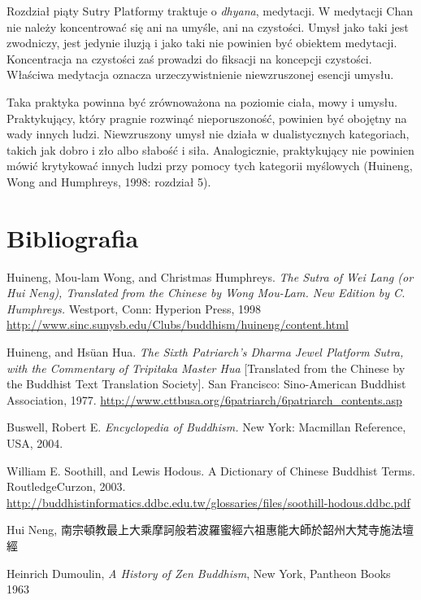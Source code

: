 Rozdział piąty Sutry Platformy traktuje o \emph{dhyana}, medytacji. W medytacji Chan nie należy koncentrować się ani na umyśle, ani na czystości. Umysł jako taki jest zwodniczy, jest jedynie iluzją i jako taki nie powinien być obiektem medytacji. Koncentracja na czystości zaś prowadzi do fiksacji na koncepcji czystości. Właściwa medytacja oznacza urzeczywistnienie niewzruszonej esencji umysłu.

Taka praktyka powinna być zrównoważona na poziomie ciała, mowy i umysłu. Praktykujący, który pragnie rozwinąć nieporuszoność, powinien być obojętny na wady innych ludzi. Niewzruszony umysł nie działa w dualistycznych kategoriach, takich jak dobro i zło albo słabość i siła. Analogicznie, praktykujący nie powinien mówić krytykować innych ludzi przy pomocy tych kategorii myślowych (Huineng, Wong and Humphreys, 1998: rozdział 5).

\section*{Bibliografia}

Huineng, Mou-lam Wong, and Christmas Humphreys. \emph{The Sutra of Wei Lang (or Hui Neng), Translated from the Chinese by Wong Mou-Lam. New Edition by C. Humphreys.} Westport, Conn: Hyperion Press, 1998 
\url{http://www.sinc.sunysb.edu/Clubs/buddhism/huineng/content.html}

Huineng, and Hsüan Hua. \emph{The Sixth Patriarch's Dharma Jewel Platform Sutra, with the Commentary of Tripitaka Master Hua} [Translated from the Chinese by the Buddhist Text Translation Society]. San Francisco: Sino-American Buddhist Association, 1977.
\url{http://www.cttbusa.org/6patriarch/6patriarch_contents.asp}

Buswell, Robert E. \emph{Encyclopedia of Buddhism.} New York: Macmillan Reference, USA, 2004. 

William E. Soothill, and Lewis Hodous. A Dictionary of Chinese Buddhist Terms. RoutledgeCurzon, 2003. \url{http://buddhistinformatics.ddbc.edu.tw/glossaries/files/soothill-hodous.ddbc.pdf}

Hui Neng, 南宗頓教最上大乘摩訶般若波羅蜜經六祖惠能大師於韶州大梵寺施法壇經

Heinrich Dumoulin, \emph{A History of Zen Buddhism}, New York, Pantheon Books 1963